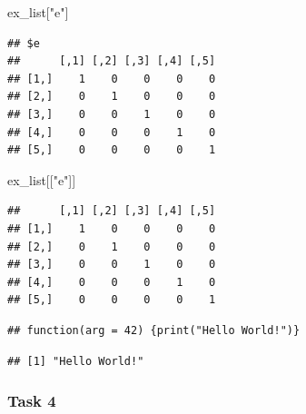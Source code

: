 \documentclass[]{book}
\newenvironment{Shaded}{\begin{snugshade}}{\end{snugshade}}
\newcommand{\KeywordTok}[1]{\textcolor[rgb]{0.13,0.29,0.53}{\textbf{#1}}}
\newcommand{\DataTypeTok}[1]{\textcolor[rgb]{0.13,0.29,0.53}{#1}}
\newcommand{\DecValTok}[1]{\textcolor[rgb]{0.00,0.00,0.81}{#1}}
\newcommand{\StringTok}[1]{\textcolor[rgb]{0.31,0.60,0.02}{#1}}
\newcommand{\OperatorTok}[1]{\textcolor[rgb]{0.81,0.36,0.00}{\textbf{#1}}}
\newcommand{\NormalTok}[1]{#1}
\begin{document}
\begin{Shaded}
\begin{Highlighting}[]
\NormalTok{ex_list[}\StringTok{"e"}\NormalTok{]}
\end{Highlighting}
\end{Shaded}

\begin{verbatim}
## $e
##      [,1] [,2] [,3] [,4] [,5]
## [1,]    1    0    0    0    0
## [2,]    0    1    0    0    0
## [3,]    0    0    1    0    0
## [4,]    0    0    0    1    0
## [5,]    0    0    0    0    1
\end{verbatim}

\begin{Shaded}
\begin{Highlighting}[]
\NormalTok{ex_list[[}\StringTok{"e"}\NormalTok{]]}
\end{Highlighting}
\end{Shaded}

\begin{verbatim}
##      [,1] [,2] [,3] [,4] [,5]
## [1,]    1    0    0    0    0
## [2,]    0    1    0    0    0
## [3,]    0    0    1    0    0
## [4,]    0    0    0    1    0
## [5,]    0    0    0    0    1
\end{verbatim}

\begin{Shaded}
\end{Shaded}

\begin{verbatim}
## function(arg = 42) {print("Hello World!")}
\end{verbatim}

\begin{Shaded}
\end{Shaded}

\begin{verbatim}
## [1] "Hello World!"
\end{verbatim}

\subsubsection{Task 4}\label{task-4}
\end{document}
